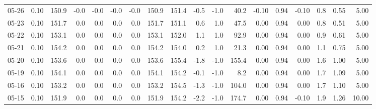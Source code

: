 \begin{threeparttable}
{\begin{tabular}{lrrrrrrrrrrrrrrrrr}
  05-26 &     0.10 & 150.9 &              -0.0 &              -0.0 &               -0.0 &               -0.0 & 150.9 & 151.4 &       -0.5 &                     -1.0 &                40.2 &      -0.10 &      0.94 &          -0.10 &              0.8 &            0.55 &                   5.00 \\
  05-23 &     0.10 & 151.7 &               0.0 &               0.0 &                0.0 &                0.0 & 151.7 & 151.1 &        0.6 &                      1.0 &                47.5 &       0.00 &      0.94 &           0.00 &              0.8 &            0.51 &                   5.00 \\
  05-22 &     0.10 & 153.1 &               0.0 &               0.0 &                0.0 &                0.0 & 153.1 & 152.0 &        1.1 &                      1.0 &                92.9 &       0.00 &      0.94 &           0.00 &              0.9 &            0.61 &                   5.00 \\
  05-21 &     0.10 & 154.2 &               0.0 &               0.0 &                0.0 &                0.0 & 154.2 & 154.0 &        0.2 &                      1.0 &                21.3 &       0.00 &      0.94 &           0.00 &              1.1 &            0.75 &                   5.00 \\
  05-20 &     0.10 & 153.6 &               0.0 &               0.0 &                0.0 &                0.0 & 153.6 & 155.4 &       -1.8 &                     -1.0 &               155.4 &       0.00 &      0.94 &           0.00 &              1.6 &            1.00 &                   5.00 \\
  05-19 &     0.10 & 154.1 &               0.0 &               0.0 &                0.0 &                0.0 & 154.1 & 154.2 &       -0.1 &                     -1.0 &                 8.2 &       0.00 &      0.94 &           0.00 &              1.7 &            1.09 &                   5.00 \\
  05-16 &     0.10 & 153.2 &               0.0 &               0.0 &                0.0 &                0.0 & 153.2 & 154.5 &       -1.3 &                     -1.0 &               104.0 &       0.00 &      0.94 &           0.00 &              1.7 &            1.10 &                   5.00 \\
  05-15 &     0.10 & 151.9 &               0.0 &               0.0 &                0.0 &                0.0 & 151.9 & 154.2 &       -2.2 &                     -1.0 &               174.7 &       0.00 &      0.94 &          -0.10 &              1.9 &            1.26 &                  10.00 \\

\end{tabular}}
\end{threeparttable}
